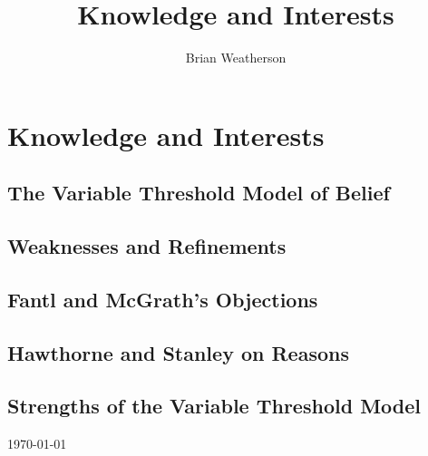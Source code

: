 \documentclass[oneside]{book}
\title{Knowledge and Interests}
\author{Brian Weatherson}
\begin{document}
\chapter[Knowledge and Interests]{Knowledge and Interests}

\section{The Variable Threshold Model of Belief}

\section{Weaknesses and Refinements}

\section{Fantl and McGrath's Objections}



\section{Hawthorne and Stanley on Reasons}

\section{Strengths of the Variable Threshold Model}





\begin{flushright}
\medskip
\today
\end{flushright}



\end{document}
